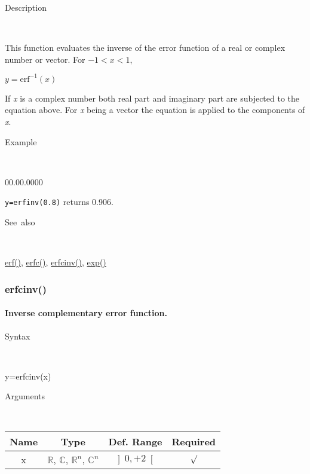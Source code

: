\begin{description}
\item [Description]~
\end{description}
This function evaluates the inverse of the error function of a real
or complex number or vector. For $-1<x<1$,

\medskip{}
$y=\mathit{\mathrm{erf^{-1}}}(x)$
\medskip{}

If \textit{x} is a complex number both real part and imaginary
part are subjected to the equation above. For \textit{x} being a vector
the equation is applied to the components of \textit{x}.

\begin{description}
\item [Example]~
\end{description}
\begin{lyxlist}{00.00.0000}
\item [\texttt{y=erfinv(0.8)}]returns 0.906.
\end{lyxlist}
\begin{description}
\item [See~also]~
\end{description}
\textcolor{blue}{\hyperlink{erf}{erf()}}\textcolor{black}{,} \textcolor{blue}{\hyperlink{erfc}{erfc()}}\textcolor{black}{,}
\textcolor{blue}{\hyperlink{erfcinv}{erfcinv()}}\textcolor{black}{,}
\textcolor{blue}{\hyperlink{exp}{exp()}}


\newpage
\subsubsection*{\hypertarget{erfcinv}{}{\Large erfcinv()}}


\paragraph{\label{par:Inverse-complementary-error}Inverse complementary error
function.}

\begin{description}
\item [Syntax]~
\end{description}
y=erfcinv(x)

\begin{description}
\item [Arguments]~
\end{description}
\begin{tabular}{|c|c|c|c|}
\hline 
Name&
Type&
Def. Range&
Required\tabularnewline
\hline
\hline 
x&
$\mathbb{R}$, $\mathbb{C}$, $\mathbb{R}^{n}$, $\mathbb{C}^{n}$&
$\left]0,+2\right[$&
$\surd$\tabularnewline
\hline
\end{tabular}

